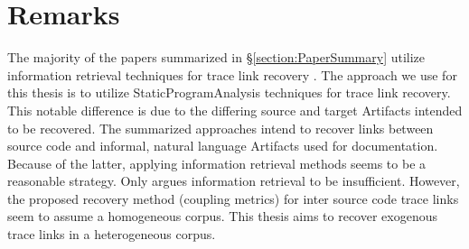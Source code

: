\section{Remarks}
\label{section:Remarks}
The majority of the papers summarized in §\ref{section:PaperSummary} utilize information retrieval techniques for trace link recovery
\cite{DeLucia2012} 
\cite{AntoniolCCDM00}
\cite{AntoniolCDLM99}
\cite{McMillanPR2009}
\cite{Lucia:2007:RTL:1276933.1276934}
\cite{TraceME}
\cite{OpenTrace}
\cite{Traceclipse}.
The approach we use for this thesis is to utilize \gls{StaticProgramAnalysis} techniques for trace link recovery.
This notable difference is due to the differing source and target \glspl{Artifact} intended to be recovered.
The summarized approaches intend to recover links between source code and informal, natural language \glspl{Artifact} used for documentation.
Because of the latter, applying information retrieval methods seems to be a reasonable strategy.
Only \cite{McMillanPR2009} argues information retrieval to be insufficient.
However, the proposed recovery method (coupling metrics) for inter source code trace links seem to assume a homogeneous corpus.
This thesis aims to recover exogenous trace links in a heterogeneous corpus.
 

